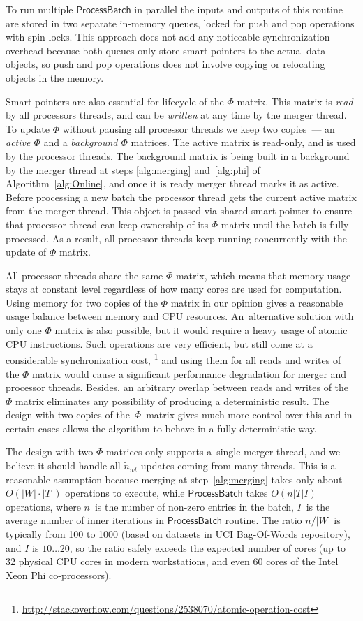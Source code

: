 \documentclass{sig-alternate-2013}
\newcommand{\kw}[1]{\textsf{#1}}
\begin{document}
To run multiple $\kw{ProcessBatch}$ in parallel the inputs and outputs of this routine are stored in two separate in-memory queues,
locked for push and pop operations with spin locks.
This approach does not add any noticeable synchronization overhead because
both queues only store smart pointers to the actual data objects,
so push and pop operations does not involve copying or relocating objects in the memory.

Smart pointers are also essential for lifecycle of the $\Phi$ matrix.
This matrix is \emph{read} by all processors threads, and can be \emph{written} at any time by the merger thread.
To update $\Phi$ without pausing all processor threads we keep two copies~--- an \emph{active $\Phi$} and a \emph{background $\Phi$} matrices.
The active matrix is read-only, and is used by the processor threads.
The background matrix is being built in a background by the merger thread
at steps \ref{alg:merging} and~\ref{alg:phi} of Algorithm~\ref{alg:Online},
and once it is ready merger thread marks it as active.
Before processing a new batch the processor thread gets the current active matrix from the merger thread.
This object is passed via shared smart pointer to ensure that processor thread can keep ownership of its $\Phi$ matrix
until the batch is fully processed.
As a result, all processor threads keep running concurrently with the update of $\Phi$ matrix.

All processor threads share the same $\Phi$ matrix,
which means that memory usage stays at constant level regardless of how many cores are used for computation.
Using memory for two copies of the $\Phi$ matrix in our opinion gives a reasonable usage balance between memory and CPU resources.
An~alternative solution with only one $\Phi$ matrix is also possible, but it would require a heavy usage of atomic CPU instructions.
Such operations are very efficient, but still come at a considerable synchronization cost,%
\footnote{\url{http://stackoverflow.com/questions/2538070/atomic-operation-cost}}
and using them for all reads and writes of the $\Phi$ matrix would cause a significant performance degradation for merger and processor threads.
Besides, an arbitrary overlap between reads and writes of the $\Phi$ matrix eliminates any possibility of producing a deterministic result.
The design with two copies of the~$\Phi$~matrix gives much more control over this
and in certain cases allows the algorithm to behave in a fully deterministic way.

The design with two $\Phi$ matrices only supports a~single merger thread,
and we believe it should handle all $\tilde n_{wt}$ updates coming from many threads.
This is a reasonable assumption because
merging at step~\ref{alg:merging} takes only about $O(|W|\cdot|T|)$ operations to execute, while
$\kw{ProcessBatch}$ takes $O(n |T| I)$ operations,
where
$n$~is the number of non-zero entries in the batch,
$I$~is the average number of inner iterations in $\kw{ProcessBatch}$ routine.
The ratio $n / |W|$ is typically from 100 to 1000 (based on datasets in UCI Bag-Of-Words repository),
and $I$ is $10 \dots 20$, so the ratio safely exceeds the expected number of cores
(up to 32 physical CPU cores in modern workstations, and even 60 cores of the Intel Xeon Phi co-processors).
\end{document}
